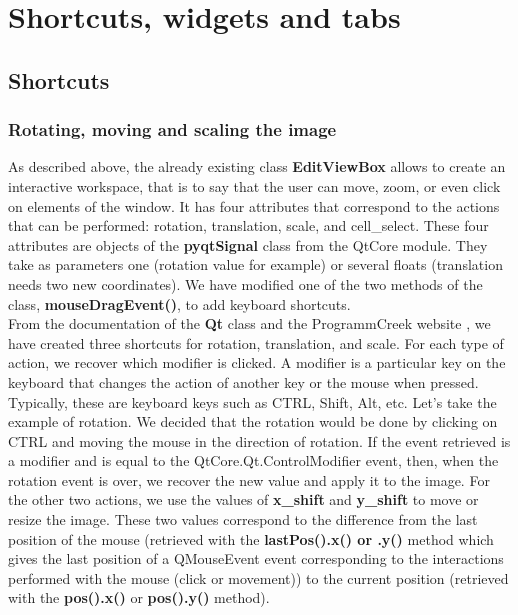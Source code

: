 \documentclass[a4paper,12pt]{report}
\begin{document}
\section{Shortcuts, widgets and tabs}
\subsection{Shortcuts}
\subsubsection{Rotating, moving and scaling the image}
As described above, the already existing class \textbf{EditViewBox} allows to create an interactive workspace, that is to say that the user can move, zoom, or even click on elements of the window. It has four attributes that correspond to the actions that can be performed: rotation, translation, scale, and cell\_select. These four attributes are objects of the \textbf{pyqtSignal} class from the QtCore module. They take as parameters one (rotation value for example) or several floats (translation needs two new coordinates). We have modified one of the two methods of the class, \textbf{mouseDragEvent()}, to add keyboard shortcuts.\\

From the documentation of the \textbf{Qt} class and the ProgrammCreek website \cite{programmercreek}, we have created three shortcuts for rotation, translation, and scale. For each type of action, we recover which modifier is clicked. A modifier is a particular key on the keyboard that changes the action of another key or the mouse when pressed. Typically, these are keyboard keys such as CTRL, Shift, Alt, etc. Let’s take the example of rotation. We decided that the rotation would be done by clicking on CTRL and moving the mouse in the direction of rotation. If the event retrieved is a modifier and is equal to the QtCore.Qt.ControlModifier event, then, when the rotation event is over, we recover the new value and apply it to the image. For the other two actions, we use the values of \textbf{x\_shift} and \textbf{y\_shift} to move or resize the image. These two values correspond to the difference from the last position of the mouse (retrieved with the \textbf{lastPos().x() or .y()} method which gives the last position of a QMouseEvent event corresponding to the interactions performed with the mouse (click or movement)) to the current position (retrieved with the \textbf{pos().x()} or \textbf{pos().y()} method).\\
\end{document}

